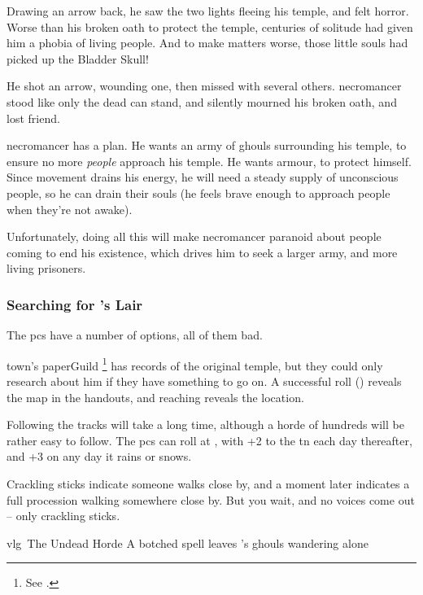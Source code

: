 \begin{exampletext}
  Drawing an arrow back, he saw the two lights fleeing his temple, and felt horror.
  Worse than his broken oath to protect the temple, centuries of solitude had given him a phobia of living people.
  And to make matters worse, those little souls had picked up the Bladder Skull!

  He shot an arrow, wounding one, then missed with several others.
  \Gls{necromancer} stood like only the dead can stand, and silently mourned his broken oath, and lost friend.

\end{exampletext}

\noindent
\Gls{necromancer} has a plan.
He wants an army of ghouls surrounding his temple, to ensure no more \emph{people} approach his temple.
He wants armour, to protect himself.
Since movement drains his energy, he will need a steady supply of unconscious people, so he can drain their souls (he feels brave enough to approach people when they're not awake).

Unfortunately, doing all this will make \gls{necromancer} paranoid about people coming to end his existence, which drives him to seek a larger army, and more living prisoners.

\subsubsection{Searching for 's Lair}
\label{huntingNecro}
The \glspl{pc} have a number of options, all of them bad.

\Gls{town}'s \gls{paperGuild}%
\footnote{See .}
has records of the original temple, but they could only research about him if they have something to go on.
A successful  roll (\tn[12]) reveals the map in the handouts, and reaching \tn[13] reveals the location.

Following the tracks will take a long time, although a horde of hundreds will be rather easy to follow.
The \glspl{pc} can roll  at \tn[5], with +2 to the \gls{tn} each day thereafter, and +3 on any day it rains or snows.

\begin{boxtext}
  Crackling sticks indicate someone walks close by, and a moment later indicates a full procession walking somewhere close by.
  But you wait, and no voices come out -- only crackling sticks.
\end{boxtext}

{\gls{vlg}~The Undead Horde}%
{A botched spell leaves 's ghouls wandering alone}%

